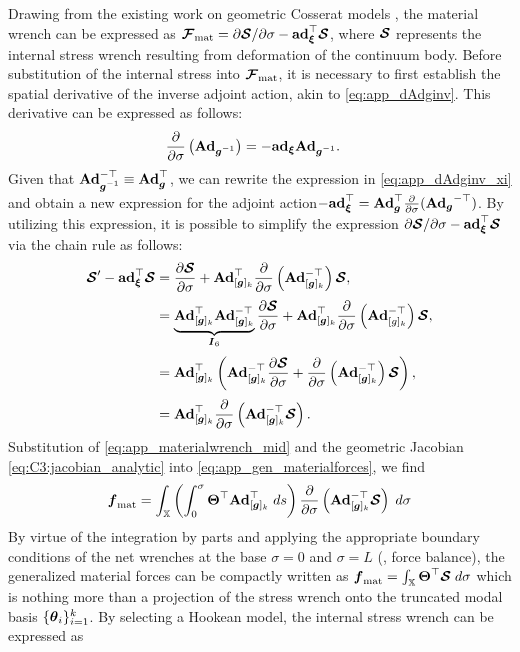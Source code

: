 Drawing from the existing work on geometric Cosserat models \cite{Grazioso2019,Renda2018,Boyer2021}, the material wrench can be expressed as $\boldsymbol{\mathcal{F}}_{\textrm{mat}} = \partial \boldsymbol{\mathcal{S}}/\partial \sigma - \textbf{ad}_{\boldsymbol{\xi}}^\top \boldsymbol{\mathcal{S}}$, where $\boldsymbol{\mathcal{S}}$ represents the internal stress wrench resulting from deformation of the continuum body. Before substitution of the internal stress into ${\boldsymbol{\mathcal{F}}}_{\textrm{mat}}$, it is necessary to first establish the spatial derivative of the inverse adjoint action, akin to \eqref{eq:app_dAdginv}. This derivative can be expressed as follows:
%
\begin{align}
\frac{\p}{\p \sigma}\left(\Ad_{\mat{g}\inv} \right) & = -\ad_{\vec{\xi}}\Ad_{\mat{g}\inv}. \label{eq:app_dAdginv_xi}
\end{align}
%
Given that $\Ad_{\gB\inv}^{-\top} \equiv \Ad_{\gB}^{\top}$, we can rewrite the expression in \eqref{eq:app_dAdginv_xi} and obtain a new expression for the adjoint action$-\textbf{ad}_{\boldsymbol{\xi}}^\top = \textbf{Ad}_{\boldsymbol{g}}^\top \frac{\partial}{\partial \sigma}({\textbf{Ad}_{\boldsymbol{g}}}^{-\top})$. By utilizing this expression, it is possible to simplify the expression $\partial \boldsymbol{\mathcal{S}}/\partial \sigma - \textbf{ad}_{\boldsymbol{\xi}}^\top \boldsymbol{\mathcal{S}}$ via the chain rule as follows:
%
\begin{align}
\boldsymbol{\mathcal{S}}' - \textbf{ad}_{{\boldsymbol{\xi}}}^\top \boldsymbol{\mathcal{S}} & = \frac{\partial \boldsymbol{\mathcal{S}}}{\partial \sigma} + \textbf{Ad}_{[{\boldsymbol{g}}]_k}^\top \frac{\partial}{\partial \sigma} \left(\textbf{Ad}_{[{\boldsymbol{g}}]_k}^{-\top} \right) \boldsymbol{\mathcal{S}}, \notag \\[0.25em]
& = \underbrace{\textbf{Ad}_{[{\boldsymbol{g}}]_k}^{\top} \textbf{Ad}_{[{\boldsymbol{g}}]_k}^{-\top}}_{{\boldsymbol{I}}_6} \frac{\partial \boldsymbol{\mathcal{S}}}{\partial \sigma} + \textbf{Ad}_{[{\boldsymbol{g}}]_k}^\top \frac{\partial}{\partial \sigma} \left(\textbf{Ad}_{[g]_k}^{-\top} \right) \boldsymbol{\mathcal{S}}, \notag \\[0.25em]
& = \textbf{Ad}_{[{\boldsymbol{g}}]_k}^\top \left( \textbf{Ad}_{[{\boldsymbol{g}}]_k}^{-\top} \frac{\partial \boldsymbol{\mathcal{S}}}{\partial \sigma}  + \frac{\partial}{\partial \sigma} \left(\textbf{Ad}_{[{\boldsymbol{g}}]_k}^{-\top} \right) \boldsymbol{\mathcal{S}} \right), \notag \\[0.25em]
& = \textbf{Ad}_{[{\boldsymbol{g}}]_k}^\top \frac{\partial}{\partial \sigma} \left( \textbf{Ad}_{[{\boldsymbol{g}}]_k}^{-\top} \boldsymbol{\mathcal{S}} \right). \label{eq:app_materialwrench_mid}
\end{align}
%
Substitution of \eqref{eq:app_materialwrench_mid} and the geometric Jacobian \eqref{eq:C3:jacobian_analytic} into \eqref{eq:app_gen_materialforces}, we find 
%
\begin{equation}
{\boldsymbol{f}}_{\textrm{mat}} = \int_{\mathbb{X}} \left( \int_0^\sigma {\boldsymbol{\Theta}}^\top \textbf{Ad}_{[{\boldsymbol{g}}]_k}^\top\; ds \right) \frac{\partial}{\partial \sigma} \left( \textbf{Ad}_{[{\boldsymbol{g}}]_k}^{-\top} \boldsymbol{\mathcal{S}} \right) \; d\sigma
\end{equation}
%
By virtue of the integration by parts and applying the appropriate boundary conditions of the net wrenches at the base $\sigma = 0$ and $\sigma = L$ (\ie, force balance), the generalized material forces can be compactly written as ${\boldsymbol{f}}_{\textrm{mat}} = \int_{\mathbb{X}} {\boldsymbol{\Theta}}^\top \boldsymbol{\mathcal{S}} \; d\sigma$ which is nothing more than a projection of the stress wrench onto the truncated modal basis $\{{\boldsymbol{\theta}}_i\}_{i=1}^k$. By selecting a Hookean model, the internal stress wrench can be expressed as 
